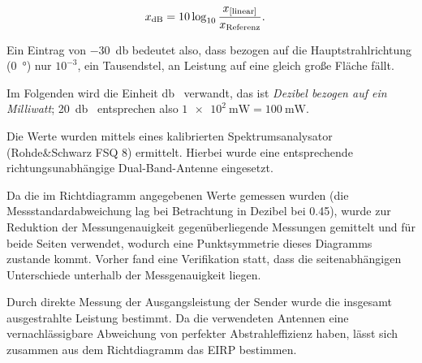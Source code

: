 \documentclass[a4paper,twoside]{scrreprt}
\begin{document}
\begin{align}
x_{\text{dB}}&=10\log_{10}\frac{x_{\text{[linear]}}}{x_{\text{Referenz}}}\text.
\end{align}

Ein Eintrag von \SI{-30}{\decibel} bedeutet also, dass bezogen auf die
Hauptstrahlrichtung (\SI{0}{\degree}) nur $10^{-3}$, ein Tausendstel, an
Leistung auf eine gleich große Fläche fällt.

Im Folgenden wird die Einheit \si{\decibel\milli{}} verwandt, das ist
\emph{Dezibel bezogen auf ein Milliwatt}; \SI{20}{\decibel\milli{}} entsprechen
also $\SI{1e2}{\milli\watt}=\SI{100}{\milli\watt}$.

Die Werte wurden mittels eines kalibrierten Spektrumsanalysator (Rohde\&Schwarz
FSQ 8) ermittelt. Hierbei wurde eine entsprechende richtungsunabhängige
Dual-Band-Antenne eingesetzt.

Da die im Richtdiagramm angegebenen Werte gemessen wurden (die
Messstandardabweichung lag bei Betrachtung in Dezibel bei 0.45), wurde zur
Reduktion der Messungenauigkeit gegenüberliegende Messungen gemittelt und für
beide Seiten verwendet, wodurch eine Punktsymmetrie dieses Diagramms zustande
kommt. Vorher fand eine Verifikation statt, dass die seitenabhängigen
Unterschiede unterhalb der Messgenauigkeit liegen.

Durch direkte Messung der Ausgangsleistung der Sender wurde die insgesamt
ausgestrahlte Leistung bestimmt. Da die verwendeten Antennen eine
vernachlässigbare Abweichung von perfekter Abstrahleffizienz haben, lässt sich
zusammen aus dem Richtdiagramm das EIRP bestimmen.
\end{document}
